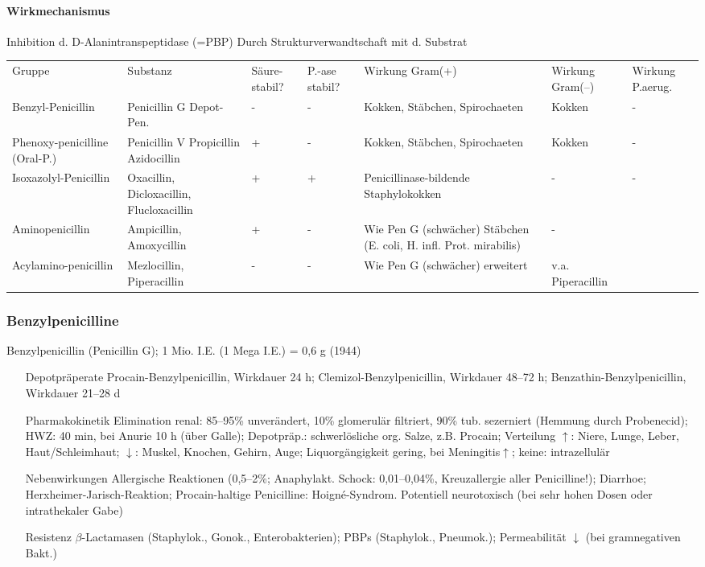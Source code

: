 \documentclass[10pt,a4paper]{report}
\begin{document}
\paragraph{Wirkmechanismus} %
\label{par:wirkmechanismus}
Inhibition d. D-Alanintranspeptidase (=PBP)
Durch Strukturverwandtschaft mit d. Substrat\\
\begin{tabularx}{\textwidth}{XXXXXXX}
Gruppe&Substanz&Säure-stabil?&P.-ase stabil?&Wirkung Gram(+)&Wirkung Gram(–)&Wirkung P.aerug.\\
Benzyl-Penicillin&Penicillin G Depot-Pen.&-&-&Kokken, Stäbchen, Spirochaeten&Kokken&-\\
Phenoxy-penicilline (Oral-P.)&Penicillin V Propicillin Azidocillin&+&-&Kokken, Stäbchen, Spirochaeten&Kokken&-\\
Isoxazolyl-Penicillin&Oxacillin, Dicloxacillin, Flucloxacillin&+&+&Penicillinase-bildende Staphylokokken&-&-\\
Aminopenicillin&Ampicillin, Amoxycillin&+&-&Wie Pen G (schwächer)
Stäbchen (E. coli, H. infl. Prot. mirabilis)&-\\
Acylamino-penicillin&Mezlocillin, Piperacillin&-&-&Wie Pen G (schwächer)
erweitert&v.a. Piperacillin\\
\end{tabularx}
\subsubsection{Benzylpenicilline} %
\label{ssub:benzylpenicilline}
Benzylpenicillin (Penicillin G); 1 Mio. I.E. (1 Mega I.E.) = 0,6 g (1944)
\begin{itemize}
	\item[Depotpräperate] Procain-Benzylpenicillin, Wirkdauer 24 h; Clemizol-Benzylpenicillin, Wirkdauer 48–72 h; Benzathin-Benzylpenicillin, Wirkdauer 21–28 d
	\item[Pharmakokinetik] Elimination renal: 85–95\% unverändert, 10\% glomerulär filtriert, 90\% tub. sezerniert (Hemmung durch Probenecid); HWZ: 40 min, bei Anurie 10 h (über Galle); Depotpräp.: schwerlösliche org. Salze, z.B. Procain; Verteilung $\uparrow$: Niere, Lunge, Leber, Haut/Schleimhaut; $\downarrow$: Muskel, Knochen, Gehirn, Auge;  Liquorgängigkeit gering, bei Meningitis$\uparrow$; keine: intrazellulär 
	\item[Nebenwirkungen] Allergische Reaktionen (0,5–2\%; Anaphylakt. Schock: 0,01–0,04\%, Kreuzallergie aller Penicilline!); Diarrhoe; Herxheimer-Jarisch-Reaktion; Procain-haltige Penicilline: Hoigné-Syndrom. Potentiell neurotoxisch (bei sehr hohen Dosen oder intrathekaler Gabe)
	\item[Resistenz]  $\beta$-Lactamasen (Staphylok., Gonok., Enterobakterien); PBPs (Staphylok., Pneumok.); Permeabilität $\downarrow$ (bei gramnegativen Bakt.)
\end{itemize}
\end{document}
